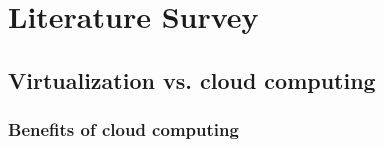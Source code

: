 \chapter{Literature Survey}


\section{Virtualization vs. cloud computing}
    \subsection{Benefits of cloud computing}
